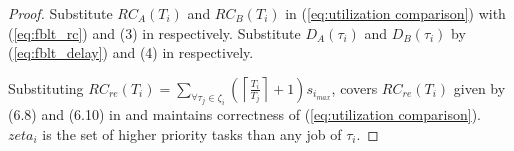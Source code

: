 \documentclass[conference,letterpaper]{IEEEtran}
\begin{document}
\begin{proof}

Substitute $RC_{A}(T_{i})$ and $RC_{B}(T_{i})$ in (\ref{eq:utilization comparison})
with (\ref{eq:fblt_rc}) and (3) in \cite{pnf_dac_asp} respectively.
Substitute $D_{A}(\tau_{i})$ and $D_{B}(\tau_{i})$ by (\ref{eq:fblt_delay})
and (4) in \cite{pnf_dac_asp} respectively. 
%

%
Substituting $RC_{re}(T_{i})=\sum_{\forall\tau_{j}\in\zeta_{i}}\left(\left\lceil \frac{T_{i}}{T_{j}}\right\rceil +1\right)s_{i_{max}}$,
covers $RC_{re}(T_{i})$ given by (6.8) and (6.10) in \cite{shambake_phd_proposal}
and maintains correctness of (\ref{eq:utilization comparison}). $zeta_i$ is the set of higher priority tasks than any job of $\tau_i$.

\end{proof}
\end{document}
